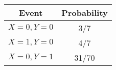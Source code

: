 \begin{tabular}{|c|c|}
\hline
Event	&Probability\\
\hline
$X = 0,Y = 0$	& 3/7 \\
\hline
$X = 1,Y = 0$	& 4/7 \\
\hline
$X = 0,Y = 1$	& 31/70 \\
\hline
\end{tabular}

